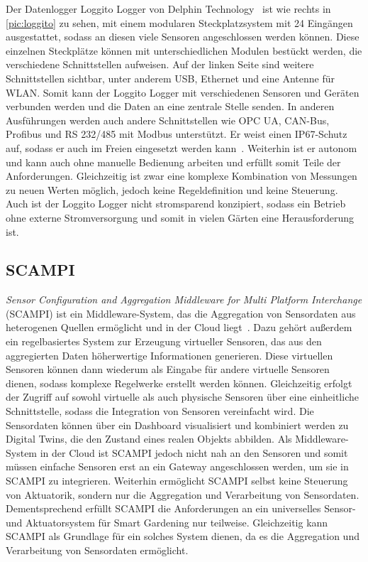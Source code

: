 
Der Datenlogger Loggito Logger von Delphin Technology~\cite{LoggitoLogger} ist wie rechts in \cref{pic:loggito} zu sehen, mit einem modularen Steckplatzsystem mit 24 Eingängen ausgestattet, sodass an diesen viele Sensoren angeschlossen werden können.
Diese einzelnen Steckplätze können mit unterschiedlichen Modulen bestückt werden, die verschiedene Schnittstellen aufweisen.
Auf der linken Seite sind weitere Schnittstellen sichtbar, unter anderem USB, Ethernet und eine Antenne für WLAN.
Somit kann der Loggito Logger mit verschiedenen Sensoren und Geräten verbunden werden und die Daten an eine zentrale Stelle senden.
In anderen Ausführungen werden auch andere Schnittstellen wie OPC UA, CAN-Bus, Profibus und RS 232/485 mit Modbus unterstützt.
Er weist einen IP67-Schutz auf, sodass er auch im Freien eingesetzt werden kann~\cite{LoggitoIP67}.
Weiterhin ist er autonom und kann auch ohne manuelle Bedienung arbeiten und erfüllt somit Teile der Anforderungen.
Gleichzeitig ist zwar eine komplexe Kombination von Messungen zu neuen Werten möglich, jedoch keine Regeldefinition und keine Steuerung.
Auch ist der Loggito Logger nicht stromsparend konzipiert, sodass ein Betrieb ohne externe Stromversorgung und somit in vielen Gärten eine Herausforderung ist.

\subsection{SCAMPI}
\emph{Sensor Configuration and Aggregation Middleware for Multi Platform Interchange} (SCAMPI) ist ein Middleware-System, das die Aggregation von Sensordaten aus heterogenen Quellen ermöglicht und in der Cloud liegt~\cite{SCAMPI}.
Dazu gehört außerdem ein regelbasiertes System zur Erzeugung virtueller Sensoren, das aus den aggregierten Daten höherwertige Informationen generieren.
Diese virtuellen Sensoren können dann wiederum als Eingabe für andere virtuelle Sensoren dienen, sodass komplexe Regelwerke erstellt werden können.
Gleichzeitig erfolgt der Zugriff auf sowohl virtuelle als auch physische Sensoren über eine einheitliche Schnittstelle, sodass die Integration von Sensoren vereinfacht wird.
Die Sensordaten können über ein Dashboard visualisiert und kombiniert werden zu Digital Twins, die den Zustand eines realen Objekts abbilden.
Als Middleware-System in der Cloud ist SCAMPI jedoch nicht nah an den Sensoren und somit müssen einfache Sensoren erst an ein Gateway angeschlossen werden, um sie in SCAMPI zu integrieren.
Weiterhin ermöglicht SCAMPI selbst keine Steuerung von Aktuatorik, sondern nur die Aggregation und Verarbeitung von Sensordaten.
Dementsprechend erfüllt SCAMPI die Anforderungen an ein universelles Sensor- und Aktuatorsystem für Smart Gardening nur teilweise.
Gleichzeitig kann SCAMPI als Grundlage für ein solches System dienen, da es die Aggregation und Verarbeitung von Sensordaten ermöglicht.

